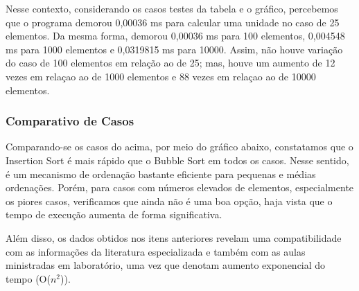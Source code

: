 \documentclass[a4paper, 12pt]{article}
\begin{document}
\vspace{0.8cm}
Nesse contexto, considerando os casos testes da tabela e o gráfico, percebemos que o programa demorou 0,00036 ms para calcular uma unidade no caso de 25 elementos. Da mesma forma, demorou 0,00036 ms para 100 elementos, 0,004548 ms para 1000 elementos e 0,0319815 ms para 10000. Assim, não houve variação do caso de 100 elementos em relação ao de 25; mas, houve um aumento de 12 vezes em relaçao ao de 1000 elementos e 88 vezes em relaçao ao de 10000 elementos.

\subsubsection{Comparativo de Casos}

\tab{ }Comparando-se os casos do acima, por meio do gráfico abaixo, constatamos que o Insertion Sort é mais rápido que o Bubble Sort em todos os casos. Nesse sentido, é um mecanismo de ordenação bastante eficiente para pequenas e médias ordenações. Porém, para casos com números elevados de elementos, especialmente os piores casos, verificamos que ainda não é uma boa opção, haja vista que o tempo de execução aumenta de forma significativa.

\begin{center}
\end{center}


\vspace{0.8cm}
Além disso, os dados obtidos nos itens anteriores revelam uma compatibilidade com as informações da literatura especializada e também com as aulas ministradas em laboratório, uma vez que denotam aumento exponencial do tempo (O($n^2$)).
\end{document}
